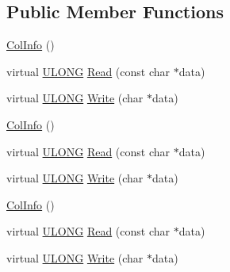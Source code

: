 \subsection*{Public Member Functions}
\begin{DoxyCompactItemize}
\item 
\hyperlink{struct_y_excel_1_1_worksheet_1_1_col_info_a5ca6400b44e051ab7ffe817c3549ed0e}{Col\+Info} ()
\item 
virtual \hyperlink{_basic_excel_8hpp_abe09d1bea023be6a07cbadde8e955435}{U\+L\+O\+N\+G} \hyperlink{struct_y_excel_1_1_worksheet_1_1_col_info_a96017984bd498fc85d22cb15ba2d58cb}{Read} (const char $\ast$data)
\item 
virtual \hyperlink{_basic_excel_8hpp_abe09d1bea023be6a07cbadde8e955435}{U\+L\+O\+N\+G} \hyperlink{struct_y_excel_1_1_worksheet_1_1_col_info_a0dbb521fbb99e85f298e3181cccb9540}{Write} (char $\ast$data)
\item 
\hyperlink{struct_y_excel_1_1_worksheet_1_1_col_info_a5ca6400b44e051ab7ffe817c3549ed0e}{Col\+Info} ()
\item 
virtual \hyperlink{_basic_excel_8hpp_abe09d1bea023be6a07cbadde8e955435}{U\+L\+O\+N\+G} \hyperlink{struct_y_excel_1_1_worksheet_1_1_col_info_a505a815f46739e3429a25a876653699c}{Read} (const char $\ast$data)
\item 
virtual \hyperlink{_basic_excel_8hpp_abe09d1bea023be6a07cbadde8e955435}{U\+L\+O\+N\+G} \hyperlink{struct_y_excel_1_1_worksheet_1_1_col_info_a3ffe2ef551d2b0a66a077681ec9f920d}{Write} (char $\ast$data)
\item 
\hyperlink{struct_y_excel_1_1_worksheet_1_1_col_info_a5ca6400b44e051ab7ffe817c3549ed0e}{Col\+Info} ()
\item 
virtual \hyperlink{_basic_excel_8hpp_abe09d1bea023be6a07cbadde8e955435}{U\+L\+O\+N\+G} \hyperlink{struct_y_excel_1_1_worksheet_1_1_col_info_a505a815f46739e3429a25a876653699c}{Read} (const char $\ast$data)
\item 
virtual \hyperlink{_basic_excel_8hpp_abe09d1bea023be6a07cbadde8e955435}{U\+L\+O\+N\+G} \hyperlink{struct_y_excel_1_1_worksheet_1_1_col_info_a3ffe2ef551d2b0a66a077681ec9f920d}{Write} (char $\ast$data)
\end{DoxyCompactItemize}
